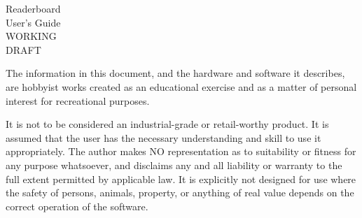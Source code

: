 
\frontmatter
{}
\newcommand\api{\acronym{API}}
\newcommand\pc{\acronym{PC}}
\newcommand\cli{\acronym{CLI}}
\newcommand\ascii{\acronym{ASCII}}
\newcommand\led{\acronym{LED}}
\newcommand\codetype[1]{\z{#1}}
\newcommand\ixz[1]{\index{#1@\z{#1}}\z{#1}}
\newcommand\tUnused{\cellcolor{gray!50}}
\newcommand\tControl{\cellcolor{yellow!50}}
\newcommand\tForbidden{\cellcolor{red!50}}
\newcommand\tSpecial{\cellcolor{blue!25}}
\newcommand\MUST{\mc{MUST}}
\newcommand\SHOULD{\mc{SHOULD}}
\thispagestyle{empty}
	\begin{center}
		\Huge Readerboard \\ User's Guide \\
		WORKING\\DRAFT
	\end{center}

\vfill
\newpage
The information in this document, and the hardware and software it describes, are hobbyist
works created as an educational exercise and as a matter of personal interest for recreational
purposes.

It is not to be considered an industrial-grade or retail-worthy product.
It is assumed that the user has the necessary understanding and skill to use it appropriately.  The author makes NO
representation as to suitability or fitness for any purpose whatsoever, and disclaims any and all liability or 
warranty to the full extent permitted by applicable law.  It is explicitly not designed for use where the safety
of persons, animals, property, or anything of real value depends on the correct operation of the software.

